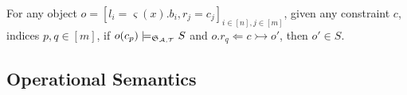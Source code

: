 \begin{thm}
  For any object $o = [l_i = \varsigma(x) . b_i , r_j = c_j]_{i \in [n], j \in [m]}$, given any
  constraint $c$, indices $p,q \in [m]$, if $o(c_p) \models_{{\mathfrak{S}_{\mathcal{A},\mathcal{T}}}} S$ and $o.r_q
  \Leftarrow c \rightarrowtail o'$, then $o' \in S$.
\end{thm}


\subsection{Operational Semantics}